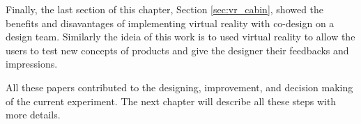 Finally, the last section of this chapter, Section \ref{sec:vr_cabin}, showed the benefits and disavantages of implementing virtual reality with co-design on a design team. Similarly the ideia of this work is to used virtual reality to allow the users to test new concepts of products and give the designer their feedbacks and impressions.

All these papers contributed to the designing, improvement, and decision making of the current experiment. The next chapter will describe all these steps with more details.

